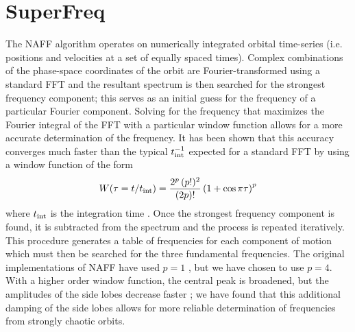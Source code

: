 \section{SuperFreq}\label{sec:naffapdx}

\renewcommand{\thefigure}{\thesection.\arabic{figure}}

The NAFF algorithm operates on numerically integrated orbital time-series (i.e. positions and velocities at a set of equally spaced times). Complex combinations of the phase-space coordinates of the orbit are Fourier-transformed using a standard FFT and the resultant spectrum is then searched for the strongest frequency component; this serves as an initial guess for the frequency of a particular Fourier component. Solving for the frequency that maximizes the Fourier integral of the FFT with a particular window function allows for a more accurate determination of the frequency. It has been shown that this accuracy converges much faster than the typical $t_{\rm int}^{-1}$ expected for a standard FFT by using a window function of the form 
\begin{equation}
	W(\tau=t/t_{\rm int}) = \frac{2^p \, (p!)^2}{(2p)!} \left( 1 + \cos \pi \tau\right)^p
\end{equation}
where $t_{\rm int}$ is the integration time \citep{laskar99}. Once the strongest frequency component is found, it is subtracted from the spectrum and the process is repeated iteratively. This procedure generates a table of frequencies for each component of motion which must then be searched for the three fundamental frequencies. The original implementations of NAFF have used $p=1$ \citep[e.g.,][]{laskar93, valluri98}, but we have chosen to use $p=4$. With a higher order window function, the central peak is broadened, but the amplitudes of the side lobes decrease faster \citep[see][]{hunter02}; we have found that this additional damping of the side lobes allows for more reliable determination of frequencies from strongly chaotic orbits. 

